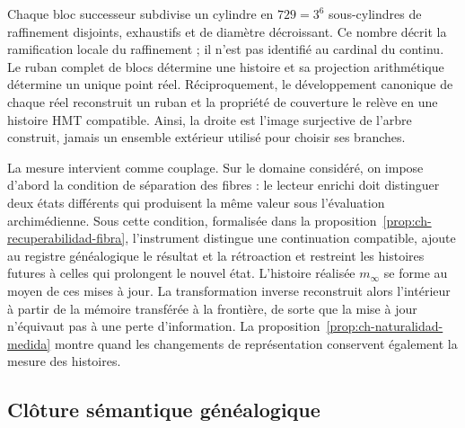 Chaque bloc successeur subdivise un cylindre en \(729=3^6\) sous-cylindres de raffinement disjoints, exhaustifs et de diamètre décroissant. Ce nombre décrit la ramification locale du raffinement ; il n'est pas identifié au cardinal du continu. Le ruban complet de blocs détermine une histoire et sa projection arithmétique détermine un unique point réel. Réciproquement, le développement canonique de chaque réel reconstruit un ruban et la propriété de couverture le relève en une histoire HMT compatible. Ainsi, la droite est l'image surjective de l'arbre construit, jamais un ensemble extérieur utilisé pour choisir ses branches.

La mesure intervient comme couplage. Sur le domaine considéré, on
impose d’abord la condition de séparation des fibres : le lecteur enrichi
doit distinguer deux états différents qui produisent la même valeur sous l’évaluation archimédienne. Sous cette
condition, formalisée dans la
proposition~\ref{prop:ch-recuperabilidad-fibra}, l’instrument distingue une
continuation compatible, ajoute au registre généalogique le résultat et la
rétroaction et restreint les histoires futures à celles qui prolongent le nouvel
état. L’histoire réalisée \(m_\infty\) se forme au moyen de ces
mises à jour. La transformation inverse reconstruit alors l’intérieur
à partir de la mémoire transférée à la frontière, de sorte que la mise à jour
n’équivaut pas à une perte d’information. La
proposition~\ref{prop:ch-naturalidad-medida} montre quand les changements de
représentation conservent également la mesure des histoires.

\subsection{Clôture sémantique généalogique}

